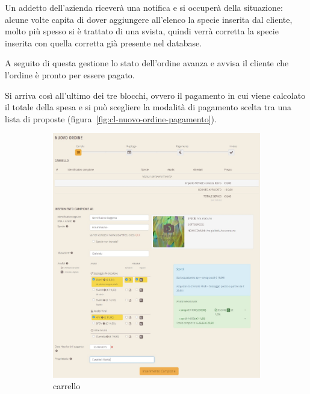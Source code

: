 Un addetto dell'azienda riceverà una notifica e si occuperà della situazione: alcune volte capita di dover aggiungere all'elenco la specie inserita dal cliente, molto più spesso si è trattato di una svista, quindi verrà corretta la specie inserita con quella corretta già presente nel database.

A seguito di questa gestione lo stato dell'ordine avanza e avvisa il cliente che l'ordine è pronto per essere pagato.

Si arriva così all'ultimo dei tre blocchi, ovvero il \textsf{pagamento} in cui viene calcolato il totale della spesa e si può scegliere la modalità di pagamento scelta tra una lista di proposte (figura~\ref{fig:cl-nuovo-ordine-pagamento}).

\begin{figure}
 \centering
 \begin{subfigure}[b]{0.32\textwidth}
   \includegraphics[width=\textwidth]{images/cl-nuovo-ordine-carrello}
   \caption{carrello}
   \label{fig:cl-nuovo-ordine-carrello}
 \end{subfigure}
 \begin{subfigure}[b]{0.33\textwidth}

\end{subfigure}
\end{figure}
